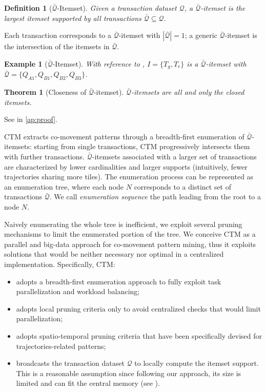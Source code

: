 \documentclass[preprint,12pt,authoryear]{elsarticle} %
\newtheorem{theorem}{Theorem}
\newtheorem{example}{Example}
\newtheorem{definition}{Definition}
\begin{document}
\begin{definition}[$\bar{\mathcal{Q}}$-Itemset]
Given a transaction dataset $\mathcal{Q}$, a \textit{$\bar{\mathcal{Q}}$-itemset} is the largest itemset supported by all transactions $\bar{\mathcal{Q}} \subseteq \mathcal{Q}$.
\end{definition}
Each transaction corresponds to a $\bar{\mathcal{Q}}$-itemset with $|\bar{\mathcal{Q}}|=1$; a generic $\bar{\mathcal{Q}}$-itemset is the intersection of the itemsets in $\bar{\mathcal{Q}}$.
\begin{example}[$\bar{\mathcal{Q}}$-Itemset]
With reference to , $I = \{T_g,T_r\}$ is a $\bar{\mathcal{Q}}$-itemset with $\bar{\mathcal{Q}}=\{Q_{A1},Q_{B1},Q_{B2},Q_{B3}\}$.
\end{example}
\begin{theorem}[Closeness of $\bar{\mathcal{Q}}$-itemset]
$\bar{\mathcal{Q}}$-itemsets are all and only the closed itemsets.
\end{theorem}
See  in \ref{ap:proof}.

CTM extracts co-movement patterns through a breadth-first enumeration of $\bar{\mathcal{Q}}$-itemsets: starting from single transactions, CTM progressively intersects them with further transactions.
$\bar{\mathcal{Q}}$-itemsets associated with a larger set of transactions are characterized by lower cardinalities and larger supports (intuitively, fewer trajectories sharing more tiles).
The enumeration process can be represented as an enumeration tree, where each node $N$ corresponds to a distinct set of transactions $\bar{\mathcal{Q}}$.
We call \textit{enumeration sequence} the path leading from the root to a node $N$.

Naively enumerating the whole tree is inefficient, we exploit several pruning mechanisms to limit the enumerated portion of the tree.
We conceive CTM as a parallel and big-data approach for co-movement pattern mining, thus it exploits solutions that would be neither necessary nor optimal in a centralized implementation.
Specifically, CTM:
\begin{itemize}
\item adopts a breadth-first enumeration approach to fully exploit task parallelization and workload balancing;
\item adopts local pruning criteria only to avoid centralized checks that would limit parallelization;
\item adopts spatio-temporal pruning criteria that have been specifically devised for trajectories-related patterns;
\item broadcasts the transaction dataset $\mathcal{Q}$ to locally compute the itemset support.
This is a reasonable assumption since following our approach, its size is limited and can fit the central memory (see ).
\end{itemize}
\end{document}
